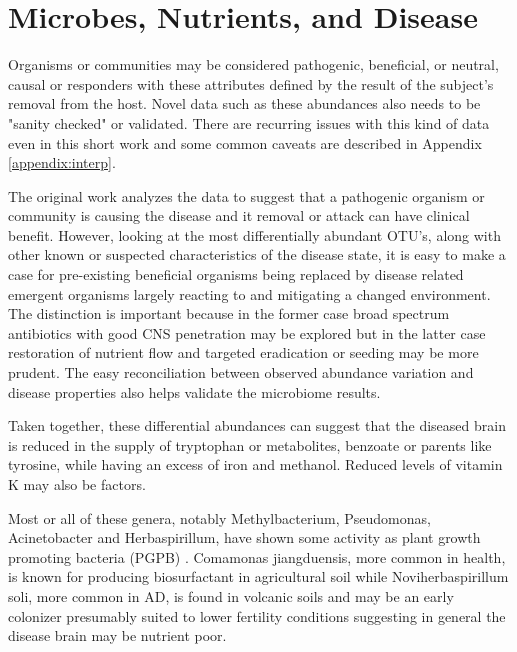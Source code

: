 \documentclass[aps,secnumarabic,balancelastpage,amsmath,amssymb,nofootinbib]{revtex4}
\newcommand{\mjmrefapp}[1]{Appendix   \ref{appendix:#1}}
\begin{document}
\comamonas

\cloacibacterium

\putida

\thermotolerans

\diaphorobacter


\acinetobacter
\tjernbergiae





\section{ Microbes, Nutrients, and Disease }



Organisms or communities may be considered pathogenic,
beneficial, or neutral, causal or responders 
with these attributes defined by the result of
the subject's removal from the host. 
Novel data such as these abundances also needs to
be "sanity checked" or validated. 
There are recurring issues with this kind of data
even in this short work and some common caveats
are described in \mjmrefapp{interp}.

The original work \cite{10.3389/fcimb.2023.1123228}
 analyzes the data to suggest that  
 a pathogenic organism or community is causing the disease
and it removal or attack can have clinical benefit. 
However, looking at the most differentially abundant
OTU's, along with other known or suspected characteristics
of the disease state,
 it is easy to make a case for pre-existing beneficial organisms
being replaced by disease related emergent organisms 
largely reacting to and mitigating a changed environment. 
The distinction is important because in the former case
broad spectrum antibiotics with good CNS penetration may be
explored but in the latter case restoration of nutrient
flow and targeted eradication or seeding may be more prudent.
The easy reconciliation between observed abundance variation
and disease properties also helps validate the microbiome
results. 
 
Taken together, these  differential abundances
can suggest that
the diseased brain is reduced in the supply
of tryptophan or metabolites, benzoate or parents
like tyrosine, while having an excess of
iron and methanol. 
Reduced levels of vitamin K %
may also be factors. 


Most or  all of these genera, notably Methylbacterium, Pseudomonas,
Acinetobacter and Herbaspirillum, have shown some activity as 
plant growth promoting bacteria (PGPB) \cite{GomezGodinez_AguirreNoyola_MartinezRomero_Look_Plant_2023}.
Comamonas jiangduensis, more common in health, 
is known for producing biosurfactant in
agricultural soil \cite{Sun_Zhang_Chen_Comamonas_jiangduensis_2013}
while Noviherbaspirillum soli, more common in AD, is found in 
volcanic soils and may be  an early colonizer presumably
  suited to lower fertility conditions  suggesting in general
the disease brain may be nutrient poor.
\end{document}

